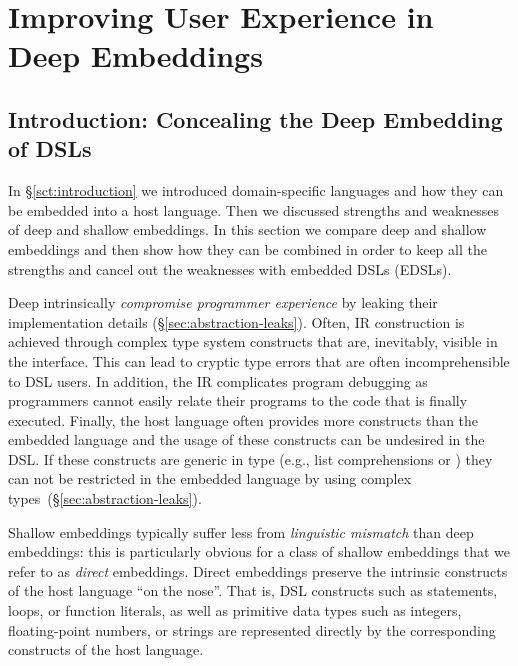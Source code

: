 \part{Improving User Experience in Deep Embeddings}

\chapter{Introduction: Concealing the Deep Embedding of DSLs}
\label{sec:introduction-yy}
In \S \ref{sct:introduction} we introduced domain-specific languages and how they can
 be embedded into a host language. Then we discussed strengths and weaknesses of deep and shallow embeddings.
 In this section we compare deep and shallow embeddings and then show how they can
 be combined in order to keep all the strengths and cancel out the weaknesses with
 embedded DSLs (EDSLs).



Deep \edsls{} intrinsically \emph{compromise programmer experience} by leaking their
implementation details (\S \ref{sec:abstraction-leaks}). Often, IR construction
is achieved through complex type system constructs that are, inevitably,
visible in the \edsl interface. This can lead to cryptic type errors
that are often incomprehensible to DSL users.
In addition, the IR complicates program debugging as programmers cannot easily
relate their programs to the code that is finally executed. Finally, the host
language often provides more constructs than the embedded language and the usage
of these constructs can be undesired in the DSL. If these constructs are generic in type
(e.g., list comprehensions or ) they can not be restricted in the embedded
language by using complex types~(\S \ref{sec:abstraction-leaks}).


Shallow embeddings typically suffer less from \emph{linguistic mismatch} than deep embeddings:
 this is particularly obvious for a class of shallow embeddings that we refer to
 as \emph{direct} embeddings. Direct embeddings preserve the intrinsic constructs
 of the host language ``on the nose''. That is, DSL
 constructs such as  statements, loops, or function literals, as well
 as primitive data types such as integers, floating-point numbers, or strings
 are represented directly by the corresponding constructs of the host language.


